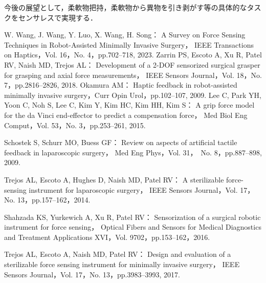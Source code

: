 \documentclass[a4paper]{jarticle}
\begin{document}
今後の展望として，柔軟物把持，柔軟物から異物を引き剥がす等の具体的なタスクをセンサレスで実現する\cite{future_work1}．
\begin{thebibliography}{9}
    \setlength{\itemsep}{0pt} %
    \renewcommand{\baselinestretch}{0.8}\selectfont %
    \setlength{\parskip}{0pt} %

    W. Wang, J. Wang, Y. Luo, X. Wang, H. Song：
    A Survey on Force Sensing Techniques in Robot-Assisted Minimally Invasive Surgery，
    IEEE Transactions on Haptics，Vol. 16，No. 4，pp.702–718, 2023.
    Zarrin PS, Escoto A, Xu R, Patel RV, Naish MD, Trejos AL： 
    Development of a 2-DOF sensorized surgical grasper for grasping and axial force measurements，
    IEEE Sensors Journal，Vol. 18，No. 7，pp.2816–2826, 2018.
    Okamura AM：
    Haptic feedback in robot-assisted minimally invasive surgery，Curr Opin Urol，pp.102–107, 2009.
    Lee C, Park YH, Yoon C, Noh S, Lee C, Kim Y, Kim HC, Kim HH, Kim S：
    A grip force model for the da Vinci end-effector to predict a compensation force，
    Med Biol Eng Comput，Vol. 53，No. 3，pp.253–261, 2015.

    Schostek S, Schurr MO, Buess GF：
    Review on aspects of artificial tactile feedback in laparoscopic surgery，
    Med Eng Phys，Vol. 31，　No. 8，pp.887–898, 2009.

    
    Trejos AL, Escoto A, Hughes D, Naish MD, Patel RV：
    A sterilizable force-sensing instrument for laparoscopic surgery，
    IEEE Sensors Journal，Vol. 17，No. 13，pp.157–162，2014.

    Shahzada KS, Yurkewich A, Xu R, Patel RV：
    Sensorization of a surgical robotic instrument for force sensing，
    Optical Fibers and Sensors for Medical Diagnostics and Treatment Applications XVI，Vol. 9702，pp.153–162，2016.
    
    Trejos AL, Escoto A, Naish MD, Patel RV：
    Design and evaluation of a sterilizable force sensing instrument for minimally invasive surgery，
    IEEE Sensors Journal，Vol. 17，No. 13，pp.3983–3993, 2017.


\end{thebibliography}
\end{document}
